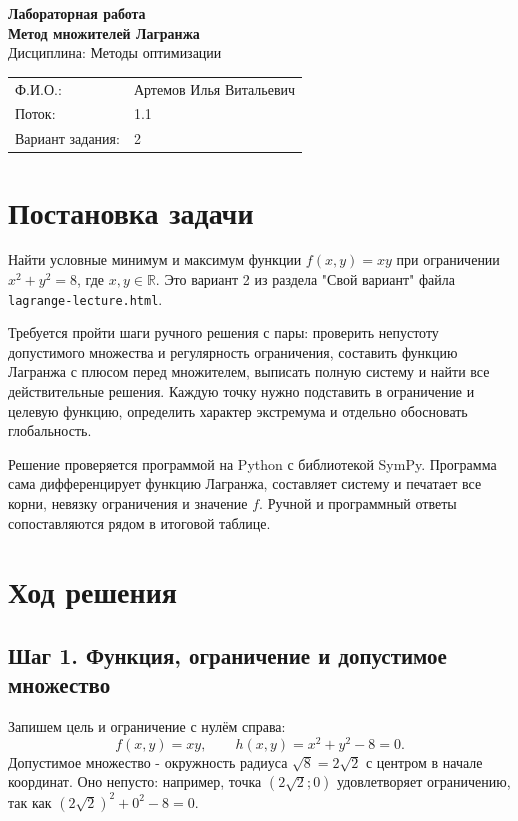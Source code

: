 \documentclass[a4paper,12pt]{article}
\begin{document}
\begin{center}
{\large\bfseries Лабораторная работа\\[2pt]
Метод множителей Лагранжа}\\[4pt]
Дисциплина: Методы оптимизации
\end{center}

\begin{tabular}{@{}ll}
Ф.И.О.: & Артемов Илья Витальевич\\
Поток: & 1.1\\
Вариант задания: & 2\\
\end{tabular}

\section{Постановка задачи}

Найти условные минимум и максимум функции $f(x,y)=xy$ при ограничении $x^2+y^2=8$, где $x,y\in\mathbb R$. Это вариант 2 из раздела "Свой вариант" файла \texttt{lagrange-lecture.html}.

Требуется пройти шаги ручного решения с пары: проверить непустоту допустимого множества и регулярность ограничения, составить функцию Лагранжа с плюсом перед множителем, выписать полную систему и найти все действительные решения. Каждую точку нужно подставить в ограничение и целевую функцию, определить характер экстремума и отдельно обосновать глобальность.

Решение проверяется программой на Python с библиотекой SymPy. Программа сама дифференцирует функцию Лагранжа, составляет систему и печатает все корни, невязку ограничения и значение $f$. Ручной и программный ответы сопоставляются рядом в итоговой таблице.

\section{Ход решения}

\subsection*{Шаг 1. Функция, ограничение и допустимое множество}

Запишем цель и ограничение с нулём справа:
\[
f(x,y)=xy,\qquad h(x,y)=x^2+y^2-8=0.
\]
Допустимое множество - окружность радиуса $\sqrt8=2\sqrt2$ с центром в начале координат. Оно непусто: например, точка $(2\sqrt2;0)$ удовлетворяет ограничению, так как $(2\sqrt2)^2+0^2-8=0$.
\end{document}
